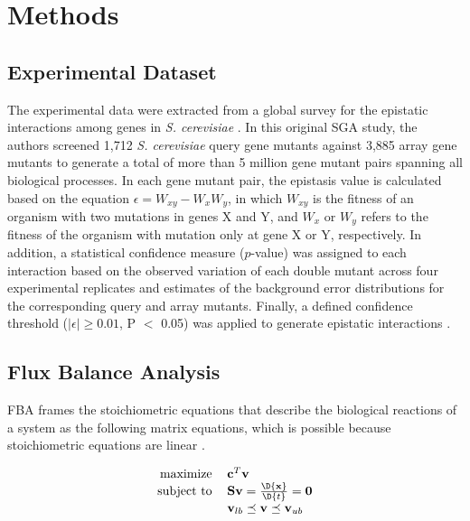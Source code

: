 \section{Methods}
\subsection{Experimental Dataset}
The experimental data were extracted from a global survey for the
epistatic interactions among genes in \textit{S. cerevisiae} \citep{Costanzo2010}. In
this original SGA study, the authors screened 1,712 \textit{S. cerevisiae}
query gene mutants against 3,885 array gene mutants to generate a
total of more than 5 million gene mutant pairs spanning all biological
processes. In each gene mutant pair, the epistasis value is calculated
based on the equation $\epsilon = W_{xy} - W_xW_y$, in which $W_{xy}$
is the fitness of an organism with two mutations in genes X and Y, and
$W_x$ or $W_y$ refers to the fitness of the organism with mutation
only at gene X or Y, respectively. In addition, a statistical
confidence measure ($p$-value) was assigned to each interaction based on
the observed variation of each double mutant across four experimental
replicates and estimates of the background error distributions for the
corresponding query and array mutants. Finally, a defined confidence
threshold ($\left|\epsilon\right| \geq 0.01$, P $<$ 0.05) was applied
to generate epistatic interactions \citep{Costanzo2010}.

\subsection{Flux Balance Analysis}

FBA frames the stoichiometric equations that describe the biological
reactions of a system as the following matrix equations, which is
possible because stoichiometric equations are linear \citep{Mo2009,
Becker2007, Smallbone2009a}.

\begin{equation}
\centering
\begin{tabular}{rl}
maximize   & $\mathbf{c}^T\mathbf{v}$                                     \\
subject to & $\mathbf{S v} = \frac{\D{\mathbf{x}}}{\D{t}} = \mathbf{0}$   \\
           & $\mathbf{v}_{lb} \preceq \mathbf{v} \preceq \mathbf{v}_{ub}$ \\
\end{tabular}
\end{equation}

